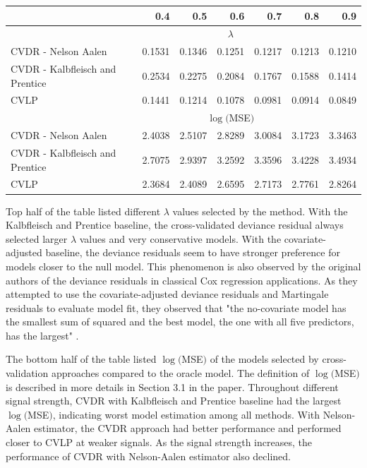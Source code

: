 \documentclass{article}
\begin{document}
\begin{table}[h]
\centering
\begin{tabular}{lrrrrrr}
\toprule
  & 0.4 & 0.5 & 0.6 & 0.7 & 0.8 & 0.9\\
\midrule
\vspace{1mm}
 & \multicolumn{5}{c}{$\lambda$} & \\ 
\vspace{1mm}
CVDR - Nelson Aalen & 0.1531 & 0.1346 & 0.1251 & 0.1217 & 0.1213 & 0.1210\\
CVDR - Kalbfleisch and Prentice& 0.2534 & 0.2275 & 0.2084 & 0.1767 & 0.1588 & 0.1414\\
CVLP & 0.1441 & 0.1214 & 0.1078 & 0.0981 & 0.0914 & 0.0849\\
\vspace{1mm}
 & \multicolumn{5}{c}{$\log($MSE$)$} & \\ 
\vspace{1mm}

CVDR - Nelson Aalen & 2.4038 & 2.5107 & 2.8289 & 3.0084 & 3.1723 & 3.3463\\
CVDR - Kalbfleisch and Prentice& 2.7075 & 2.9397 & 3.2592 & 3.3596 & 3.4228 & 3.4934\\
CVLP &2.3684 & 2.4089 & 2.6595 & 2.7173 & 2.7761 & 2.8264\\
\bottomrule
\end{tabular}
\end{table}

Top half of the table listed different $\lambda$ values selected by the method. With the Kalbfleisch and Prentice baseline, the cross-validated deviance residual always selected larger $\lambda$ values and very conservative models. With the covariate-adjusted baseline, the deviance residuals seem to have stronger preference for models closer to the null model. This phenomenon is also observed by the original authors of the deviance residuals in classical Cox regression applications. As they attempted to use the covariate-adjusted deviance residuals and Martingale residuals to evaluate model fit, they observed that "the no-covariate model has the smallest sum of squared and the best model, the one with all five predictors, has the largest" \citep{Therneau2000modeling}.

The bottom half of the table listed $\log($MSE$)$ of the models selected by cross-validation approaches compared to the oracle model. The definition of $\log($MSE$)$ is described in more details in Section 3.1 in the paper. Throughout different signal strength, CVDR with Kalbfleisch and Prentice baseline had the largest $\log($MSE$)$, indicating worst model estimation among all methods. With Nelson-Aalen estimator, the CVDR approach had better performance and performed closer to CVLP at weaker signals. As the signal strength increases, the performance of CVDR with Nelson-Aalen estimator also declined.
\end{document}
